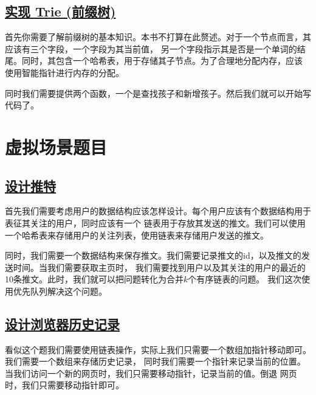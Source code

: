 \documentclass[../../main.tex]{subfiles}
\begin{document}
\subsection{\href{https://leetcode.cn/problems/implement-trie-prefix-tree/}{实现 Trie (前缀树)}}

首先你需要了解前缀树的基本知识。本书不打算在此赘述。对于一个节点而言，其应该有三个字段，一个字段为其当前值，
另一个字段指示其是否是一个单词的结尾。同时，其包含一个哈希表，用于存储其子节点。为了合理地分配内存，应该
使用智能指针进行内存的分配。

同时我们需要提供两个函数，一个是查找孩子和新增孩子。然后我们就可以开始写代码了。



\section{虚拟场景题目}

\subsection{\href{https://leetcode.cn/problems/design-twitter/}{设计推特}}

首先我们需要考虑用户的数据结构应该怎样设计。每个用户应该有个数据结构用于表征其关注的用户，同时应该有一个
链表用于存放其发送的推文。我们可以使用一个哈希表来存储用户的关注列表，使用链表来存储用户发送的推文。

同时，我们需要一个数据结构来保存推文。我们需要记录推文的id，以及推文的发送时间。当我们需要获取主页时，
我们需要找到用户以及其关注的用户的最近的10条推文。此时，我们就可以把问题转化为合并$k$个有序链表的问题。
我们这次使用优先队列解决这个问题。



\subsection{\href{https://leetcode.cn/problems/design-browser-history/}{设计浏览器历史记录}}

看似这个题我们需要使用链表操作，实际上我们只需要一个数组加指针移动即可。我们需要一个数组来存储历史记录，
同时我们需要一个指针来记录当前的位置。当我们访问一个新的网页时，我们只需要移动指针，记录当前的值。倒退
网页时，我们只需要移动指针即可。


\end{document}
